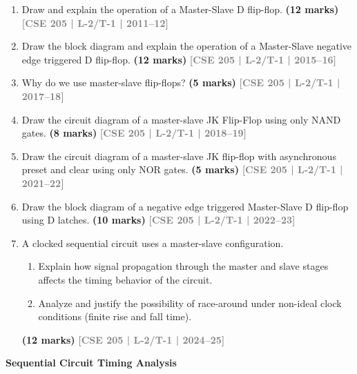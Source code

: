 \documentclass[12pt,a4paper]{article}
\newcommand{\yr}[1]{\hfill\textcolor{gray}{\small\textbf{[#1]}}}
\newcommand{\mk}[1]{\textcolor{orange!70!black}{\small\textbf{(#1 marks)}}}
\newcommand{\subtopic}[2]{%
  \vspace{10pt}
  \noindent\begin{tcolorbox}[colback=#1!8,colframe=#1,boxrule=0.6pt,arc=4pt,
    left=6pt,right=6pt,top=4pt,bottom=4pt]
    \small\bfseries\textcolor{#1}{#2}
  \end{tcolorbox}
  \vspace{2pt}
}
\begin{document}
\begin{enumerate}

\item Draw and explain the operation of a Master-Slave D flip-flop.
\mk{12} \yr{CSE 205 | L-2/T-1 | 2011--12}


\item Draw the block diagram and explain the operation of a Master-Slave negative edge triggered D flip-flop.
\mk{12} \yr{CSE 205 | L-2/T-1 | 2015--16}


\item Why do we use master-slave flip-flops?
\mk{5} \yr{CSE 205 | L-2/T-1 | 2017--18}


\item Draw the circuit diagram of a master-slave JK Flip-Flop using only NAND gates.
\mk{8} \yr{CSE 205 | L-2/T-1 | 2018--19}

\item Draw the circuit diagram of a master-slave JK flip-flop with asynchronous preset and clear using only NOR gates.
\mk{5} \yr{CSE 205 | L-2/T-1 | 2021--22}

\item Draw the block diagram of a negative edge triggered Master-Slave D flip-flop using D latches.
\mk{10} \yr{CSE 205 | L-2/T-1 | 2022--23}

\item A clocked sequential circuit uses a master-slave configuration.
\begin{enumerate}
  \item Explain how signal propagation through the master and slave stages affects the timing behavior of the circuit.
  \item Analyze and justify the possibility of race-around under non-ideal clock conditions (finite rise and fall time).
\end{enumerate}
\mk{12} \yr{CSE 205 | L-2/T-1 | 2024--25}

\end{enumerate}

\subtopic{cE}{Sequential Circuit Timing Analysis}
\label{sub:s5-timing}
\end{document}
